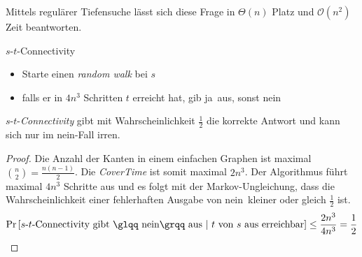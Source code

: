 Mittels regulärer Tiefensuche lässt sich diese Frage in $\Theta(n)$ Platz und
$\mathcal{O}(n^2)$ Zeit beantworten.
\begin{algorithm}[H]
	\caption{$s$-$t$-Connectivity}
	\vspace{0.4cm}
	\begin{itemize}
		\setlength{\itemsep}{2pt}
		\setlength{\parskip}{2pt}
		\setlength{\parsep}{2pt}
		\item Starte einen \emph{random walk} bei $s$
		\item falls er in $4n^3$ Schritten $t$ erreicht hat, gib \glqq
			ja\grqq\ aus, sonst \glqq nein\grqq
	\end{itemize}
\end{algorithm}
\begin{satz}
	$s$-$t$-\emph{Connectivity} gibt mit Wahrscheinlichkeit $\frac{1}{2}$
	die korrekte Antwort und kann sich nur im \glqq nein\grqq-Fall irren.
\end{satz}
\begin{proof}
	Die Anzahl der Kanten in einem einfachen Graphen ist maximal
	$\binom{n}{2} = \frac{n(n-1)}{2}$. Die \emph{CoverTime} ist somit
	maximal $2n^3$. Der Algorithmus führt maximal $4n^3$ Schritte aus und
	es folgt mit der Markov-Ungleichung, dass die Wahrscheinlichkeit einer
	fehlerhaften Ausgabe von \glqq nein\grqq\ kleiner oder gleich
	$\frac{1}{2}$ ist.
	\[
	  \Pr\left[\text{$s$-$t$-Connectivity gibt \glqq nein\grqq\ aus}\ |\
	  \text{$t$ von $s$ aus erreichbar}\right] \leq \frac{2n^3}{4n^3} =
	  \frac{1}{2}
	\]
\end{proof}
